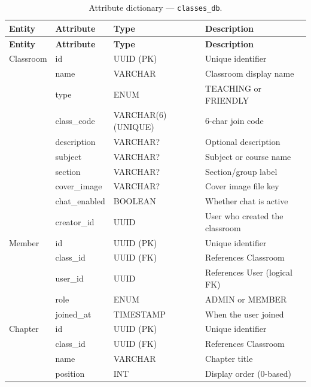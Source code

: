 \begin{longtable}{@{} l l l p{5.5cm} @{}}
  \caption{Attribute dictionary --- \texttt{classes\_db}.} \label{tab:dict-classes} \\
  \toprule
  \textbf{Entity} & \textbf{Attribute} & \textbf{Type} & \textbf{Description} \\
  \midrule
  \endfirsthead
  \toprule
  \textbf{Entity} & \textbf{Attribute} & \textbf{Type} & \textbf{Description} \\
  \midrule
  \endhead
  Classroom & id & UUID (PK) & Unique identifier \\
            & name & VARCHAR & Classroom display name \\
            & type & ENUM & TEACHING or FRIENDLY \\
            & class\_code & VARCHAR(6) (UNIQUE) & 6-char join code \\
            & description & VARCHAR? & Optional description \\
            & subject & VARCHAR? & Subject or course name \\
            & section & VARCHAR? & Section/group label \\
            & cover\_image & VARCHAR? & Cover image file key \\
            & chat\_enabled & BOOLEAN & Whether chat is active \\
            & creator\_id & UUID & User who created the classroom \\
  \midrule
  Member & id & UUID (PK) & Unique identifier \\
         & class\_id & UUID (FK) & References Classroom \\
         & user\_id & UUID & References User (logical FK) \\
         & role & ENUM & ADMIN or MEMBER \\
         & joined\_at & TIMESTAMP & When the user joined \\
  \midrule
  Chapter & id & UUID (PK) & Unique identifier \\
          & class\_id & UUID (FK) & References Classroom \\
          & name & VARCHAR & Chapter title \\
          & position & INT & Display order (0-based) \\
  \bottomrule
\end{longtable}

